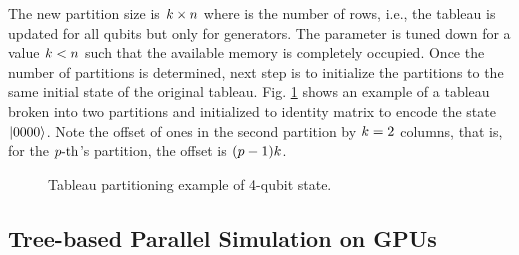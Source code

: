 \documentclass[runningheads]{llncs}
\begin{document}
The new partition size is $k \times n$ where \tableauHeight is the number of rows, i.e., the tableau is updated for all qubits but only for \tableauHeight generators. The \tableauHeight parameter is tuned down for a value $k < n$ such that the available memory is completely occupied. Once the number of partitions is determined, next step is to initialize the partitions to the same initial state of the original tableau. Fig. \ref{fig:partitions} shows an example of a tableau broken into two partitions and initialized to identity matrix to encode the state $\ket{0000}$. Note the offset of ones in the second partition by $k = 2$ columns, that is, for the $p\text{-th}$'s partition, the offset is $(p -  1)k$.

\begin{figure}[t]
	\centering
	\caption{Tableau partitioning example of 4-qubit state.}
	\label{fig:partitions}
\end{figure}


\subsection{Tree-based Parallel Simulation on GPUs}

\end{document}

